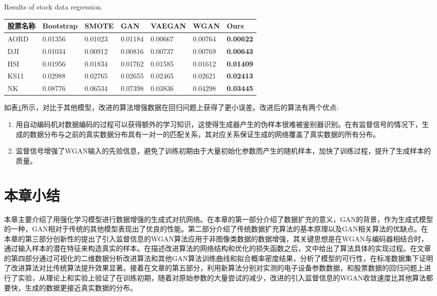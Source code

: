 \begin{table}[htpb]
	\centering
	{Results of stock data regression.}
	\label{tab2}
	\begin{tabular}{lllllll} \toprule		股票名称&Bootstrap&SMOTE& GAN &  VAEGAN & WGAN &Ours  \\ 
		\midrule
		AORD &0.01356& 0.01023&0.01184 & 0.00667 & 0.00764 &\textbf{0.00622}   \\
		DJI &0.01034&0.00912&0.00816&0.00737&0.00769&\textbf{0.00643}  \\
		HSI &0.01956&0.01834&0.01762&0.01585&0.01612&\textbf{0.01409}  \\
		KS11 &0.02988&0.02765&0.02655&0.02465&0.02621&\textbf{0.02413}\\
		NK  &0.08776&0.06534& 0.07398& 0.03836& 0.04298&\textbf{0.03445} \\
		\bottomrule
	\end{tabular}
\end{table}

如表\ref{tab2}所示，对比于其他模型，改进的算法增强数据在回归问题上获得了更小误差。改进后的算法有两个优点:
\begin{enumerate}
	\item 用自动编码机对数据编码的过程可以获得额外的学习知识，这使得生成器产生的伪样本很难被鉴别器识别。在有监督信号的情况下，生成的数据分布与之前的真实数据分布具有一对一的匹配关系，其对应关系保证生成的网络覆盖了真实数据的所有分布。
	\item 监督信号增强了WGAN输入的先验信息，避免了训练初期由于大量初始化参数而产生的随机样本，加快了训练过程，提升了生成样本的质量。
\end{enumerate}

\section{本章小结}

本章主要介绍了用强化学习模型进行数据增强的生成式对抗网络。在本章的第一部分介绍了数据扩充的意义，GAN的背景，作为生成式模型的一种，GAN相对于传统的其他模型表现出了优良的性能。第二部分介绍了传统数据扩充算法的基本原理以及GAN相关算法的优缺点。在本章的第三部分创新性的提出了引入监督信息的WGAN算法应用于非图像类数据的数据增强，其关键思想是在WGAN与编码器相结合时，通过输入样本的潜在特征来构造真实的样本。在描述改进算法的网络结构和优化的损失函数之后，文中给出了算法具体的实现过程。在文章的第四部分通过可视化的二维数据分析改进算法和其他GAN算法训练曲线和拟合概率密度结果，分析了模型的可行性，在标准数据集下证明了改进算法对比传统算法提升效果显著。接着在文章的第五部分，利用新算法分别对实测的电子设备参数数据，和股票数据的回归问题上进行了实验，从理论上和实验上验证了在训练初期，随着对原始参数的大量尝试的减少，改进的引入监督信息的WGAN收敛速度比其他算法都要快，生成的数据更接近真实数据的分布。